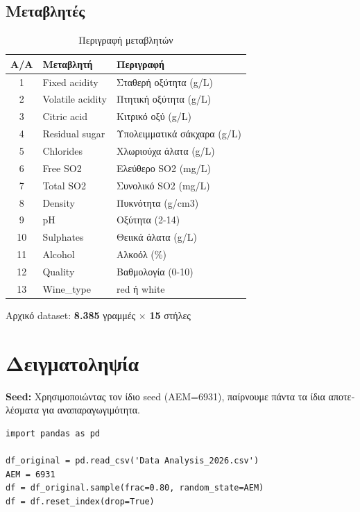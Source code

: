 \documentclass[12pt,a4paper]{article}
\begin{document}
\subsection{\textgreek{Μεταβλητές}}

\begin{table}[H]
\centering
\caption{\textgreek{Περιγραφή μεταβλητών}}
\begin{tabular}{clp{6cm}}
\toprule
\textbf{A/A} & \textbf{\textgreek{Μεταβλητή}} & \textbf{\textgreek{Περιγραφή}} \\
\midrule
1 & Fixed acidity & \textgreek{Σταθερή οξύτητα (g/L)} \\
2 & Volatile acidity & \textgreek{Πτητική οξύτητα (g/L)} \\
3 & Citric acid & \textgreek{Κιτρικό οξύ (g/L)} \\
4 & Residual sugar & \textgreek{Υπολειμματικά σάκχαρα (g/L)} \\
5 & Chlorides & \textgreek{Χλωριούχα άλατα (g/L)} \\
6 & Free SO2 & \textgreek{Ελεύθερο SO2 (mg/L)} \\
7 & Total SO2 & \textgreek{Συνολικό SO2 (mg/L)} \\
8 & Density & \textgreek{Πυκνότητα (g/cm3)} \\
9 & pH & \textgreek{Οξύτητα (2-14)} \\
10 & Sulphates & \textgreek{Θειικά άλατα (g/L)} \\
11 & Alcohol & \textgreek{Αλκοόλ (\%)} \\
12 & Quality & \textgreek{Βαθμολογία (0-10)} \\
13 & Wine\_type & \textgreek{red ή white} \\
\bottomrule
\end{tabular}
\end{table}

\textgreek{Αρχικό dataset:} \textbf{8.385} \textgreek{γραμμές} $\times$ \textbf{15} \textgreek{στήλες}

\section{\textgreek{Δειγματοληψία}}

\begin{mdframed}[style=warnbox]
\textbf{Seed:} \textgreek{Χρησιμοποιώντας τον ίδιο seed (ΑΕΜ=6931), παίρνουμε πάντα τα ίδια αποτελέσματα για αναπαραγωγιμότητα.}
\end{mdframed}

\begin{lstlisting}
import pandas as pd

df_original = pd.read_csv('Data Analysis_2026.csv')
AEM = 6931
df = df_original.sample(frac=0.80, random_state=AEM)
df = df.reset_index(drop=True)
\end{lstlisting}
\end{document}
